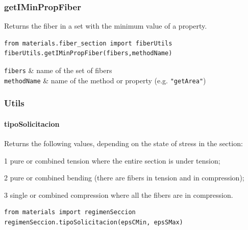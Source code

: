 \subsubsection{getIMinPropFiber}
Returns the fiber in a set with the minimum value of a property.
\noindent 
\begin{verbatim}
from materials.fiber_section import fiberUtils
fiberUtils.getIMinPropFiber(fibers,methodName)
\end{verbatim}
\begin{paramFuncTable}
{\tt fibers} & name of the set of fibers \\
{\tt methodName} & name of the method or property (e.g. {\tt "getArea"}) \\
\end{paramFuncTable}



\subsubsection{Utils}
\paragraph{tipoSolicitacion}
\noindent Returns the following values, depending on the state of stress in the section:
\begin{description}
\item{1} pure or combined tension where the entire section is under tension;
\item{2} pure or combined bending (there are fibers in tension and in compression);
\item{3} single or combined compression where all the fibers are in compression.
\end{description}
\begin{verbatim}
from materials import regimenSeccion
regimenSeccion.tipoSolicitacion(epsCMin, epsSMax)
\end{verbatim}
\begin{paramFuncTable}
\epsCMin{}\\
\epsSMax{}\\
\end{paramFuncTable}


